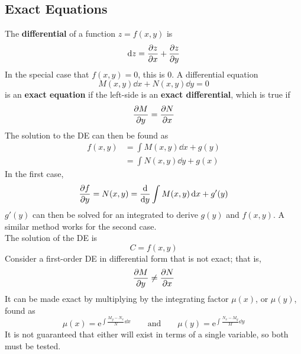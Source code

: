 \documentclass[12pt, A4]{article}
\newcommand{\en}{\text{e}}
\begin{document}
		\subsection{Exact Equations}
			The \textbf{differential} of a function \(z = f(x, y)\) is
				\[\dd{z} = \pdv{z}{x} + \pdv{z}{y}\]
				In the special case that \(f(x, y) = 0\), this is 0. 
				A differential equation
				\[M(x, y)\dd{x} + N(x, y)\dd{y} = 0\]
				is an \textbf{exact equation} if the left-side is an \textbf{exact differential}, which is true if
				\[\pdv{M}{y} = \pdv{N}{x}\]
				The solution to the DE can then be found as
				\begin{align*}
					f(x, y) &= \int M(x, y) \dd{x} + g(y) \\
						&= \int N(x, y) \dd{y} + g(x)
				\end{align*}
				In the first case,
				\[
					\pdv{f}{y} = N(x, y)
						= \dv{y}\int M(x, y) \dd{x} + g'(y)
				\]
				\(g'(y)\) can then be solved for an integrated to derive \(g(y)\) and \(f(x, y)\). A similar method works for the second case. \\
				The solution of the DE is
				\[C = f(x, y)\]
				Consider a first-order DE in differential form that is not exact; that is,
				\[\pdv{M}{y} \ne \pdv{N}{x}\]
				It can be made exact by multiplying by the integrating factor \(\mu(x)\), or \(\mu(y)\), found as
				\[
					\mu(x) = \en^{\int \frac{M_y - N_x}{N}\dd{x}} \qquad \text{and} \qquad
					\mu(y) = \en^{\int \frac{N_x - M_y}{M}\dd{y}}
				\]
				It is not guaranteed that either will exist in terms of a single variable, so both must be tested.
\end{document}
